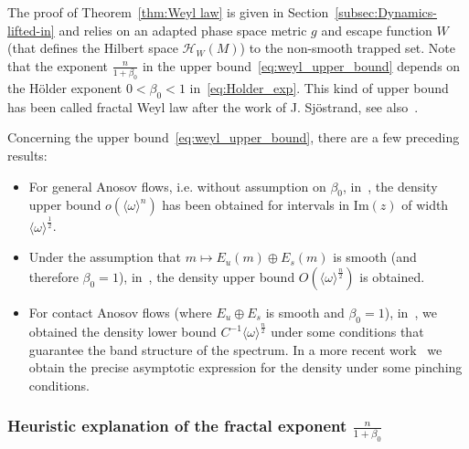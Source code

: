 \documentclass[AHL,Unicode,longabstracts,published]{cedram}
\newcommand{\clH}{\mathcal{H}}
\newcommand{\Imm}{\mathrm{Im}}
\newcommand{\Imm}{\mathrm{Im}}
\newcommand{\clH}{\mathcal{H}}
\begin{document}
The proof of Theorem~\ref{thm:Weyl law} is given in Section~\ref{subsec:Dynamics-lifted-in} and relies on an adapted phase space metric $g$ and escape function $W$ (that defines the Hilbert space $\clH _{W}(M)$) to the non-smooth trapped set. Note that the exponent $\frac{n}{1+\beta_{0}}$ in the upper bound~\eqref{eq:weyl_upper_bound} depends on the H\"older exponent $0<\beta_{0}<1$ in~\eqref{eq:Holder_exp}. This kind of upper bound has been called fractal Weyl law after the work of J. Sj\"ostrand\cite{sjostrand_90}, see also~\cite{Nonnenmacher_Zworski_14}.

Concerning the upper bound~\eqref{eq:weyl_upper_bound}, there are a few preceding results:
\begin{itemize}
\item For general Anosov flows, i.e. without assumption on $\beta_{0}$, in~\cite[Theorem~1.8]{fred_flow_09}, the density upper bound $o(\langle \omega\rangle ^{n})$ has been obtained for intervals in $\Imm(z)$ of width $\langle \omega\rangle ^{\frac{1}{2}}$.
\item Under the assumption that $m\mapsto E_{u}(m)\oplus E_{s}(m)$ is smooth (and therefore $\beta_{0}=1$), in~\cite{dyatlov_Ruelle_resonances_2012}, the density upper bound \emph{$O(\langle \omega\rangle ^{\frac{n}{2}})$} is obtained.
\item For contact Anosov flows (where $E_{u}\oplus E_{s}$ is smooth and $\beta_{0}=1$), in~\cite{faure_tsujii_band_CRAS_2013,faure-tsujii_anosov_flows_13,faure-tsujii_anosov_flows_16}, we obtained the density lower bound $C^{-1}\langle \omega\rangle ^{\frac{n}{2}}$ under some conditions that guarantee the band structure of the spectrum. In a more recent work~\cite{faure-tsujii_anosov_flows_16} we obtain the precise asymptotic expression for the density under some pinching conditions.
\end{itemize}

\subsubsection{\label{subsec:Heuristic-explanation-of}
Heuristic explanation of the fractal exponent \texorpdfstring{$\frac{n}{1+\beta_{0}}$}{n/1+ beta0}}
\end{document}
